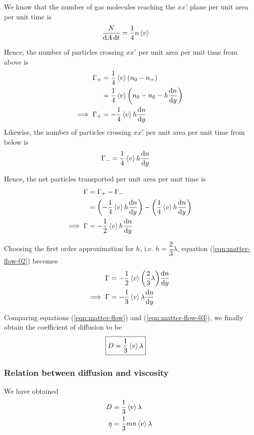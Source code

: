 		We know that the number of gas molecules reaching the $xx'$ plane per unit area per unit time is
		\begin{align*}
			\dfrac{N}{\dd{A}\dd{t}}&=\dfrac{1}{4}n\expval{v}
		\end{align*}
		
		Hence, the number of particles crossing $xx'$ per unit area per unit time from above is
		\begin{align*}
			\Gamma_+&=\dfrac{1}{4}\expval{v}\qty(n_0-n_+) \\
				&=\dfrac{1}{4}\expval{v}\qty(n_0-n_0-h\dv{n}{y}) \\
			\implies\Gamma_+&=-\dfrac{1}{4}\expval{v}h\dv{n}{y}
		\end{align*}
		Likewise, the number of particles crossing $xx'$ per unit area per unit time from below is
		\begin{align*}
			\Gamma_-&=\dfrac{1}{4}\expval{v}h\dv{n}{y}
		\end{align*}
		
		Hence, the net particles transported per unit area per unit time is
		\begin{align}
			\Gamma&=\Gamma_+-\Gamma_- \nonumber\\
				&=\qty(-\dfrac{1}{4}\expval{v}h\dv{n}{y})-\qty(\dfrac{1}{4}\expval{v}h\dv{n}{y}) \nonumber\\
			\implies\Gamma&=-\dfrac{1}{2}\expval{v}h\dv{n}{y} \label{eqn:matter-flow-02}
		\end{align}
		
		Choosing the first order approximation for $h$, i.e. $h=\dfrac{2}{3}\lambda$, equation (\ref{eqn:matter-flow-02}) becomes
		\begin{align}
			\Gamma&=-\dfrac{1}{2}\expval{v}\qty(\dfrac{2}{3}\lambda)\dv{n}{y} \nonumber\\
			\implies\Gamma&=-\dfrac{1}{3}\expval{v}\lambda\dv{n}{y} \label{eqn:matter-flow-03}
		\end{align}
		
		Comparing equations (\ref{eqn:matter-flow}) and (\ref{eqn:matter-flow-03}), we finally obtain the coefficient of diffusion to be
		\begin{align*}
			\Aboxed{D&=\dfrac{1}{3}\expval{v}\lambda}
		\end{align*}
		
		\subsubsection{Relation between diffusion and viscosity}
		We have obtained
		\begin{align*}
			D&=\dfrac{1}{3}\expval{v}\lambda \\
			\eta&=\dfrac{1}{3}mn\expval{v}\lambda
		\end{align*}
		
